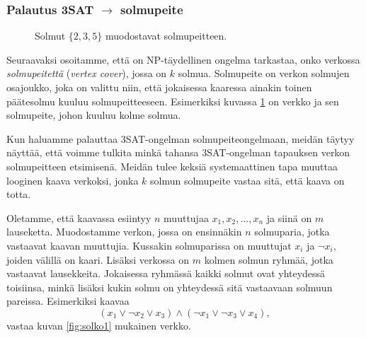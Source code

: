 \subsubsection{Palautus 3SAT $\rightarrow$ solmupeite}


\begin{figure}
\center
\begin{center}
\end{center}
\caption{Solmut $\{2,3,5\}$ muodostavat solmupeitteen.}
\label{fig:solpei}
\end{figure}

Seuraavaksi osoitamme, että on NP-täydellinen ongelma tarkastaa,
onko verkossa \emph{solmupeitettä} (\emph{vertex cover}), jossa on $k$ solmua.
Solmupeite on verkon solmujen osa\-joukko, joka on valittu niin,
että jokaisessa kaaressa ainakin toinen pääte\-solmu kuuluu
solmupeitteeseen.
Esimerkiksi kuvassa \ref{fig:solpei} on verkko ja sen solmupeite,
johon kuuluu kolme solmua.

Kun haluamme palauttaa 3SAT-ongelman solmupeiteongelmaan,
meidän täytyy näyttää, että voimme tulkita minkä tahansa
3SAT-ongelman tapauksen verkon solmupeitteen etsimisenä.
Meidän tulee keksiä systemaattinen tapa
muuttaa looginen kaava verkoksi,
jonka $k$ solmun solmupeite vastaa sitä, että kaava on totta.

Oletamme, että kaavassa esiintyy $n$ muuttujaa $x_1,x_2,\dots,x_n$
ja siinä on $m$ lauseketta.
Muodostamme verkon, jossa on ensinnäkin $n$ solmuparia,
jotka vastaavat kaavan muuttujia.
Kussakin solmuparissa on muuttujat $x_i$ ja $\neg x_i$,
joiden välillä on kaari.
Lisäksi verkossa on $m$ kolmen solmun ryhmää,
jotka vastaavat lausekkeita.
Jokaisessa ryhmässä kaikki solmut ovat yhteydessä toisiinsa,
minkä lisäksi kukin solmu on yhteydessä sitä vastaavaan solmuun pareissa.
Esimerkiksi kaavaa
\[(x_1 \lor \neg x_2 \lor x_3) \land (\neg x_1 \lor \neg x_3 \lor x_4),\]
vastaa kuvan \ref{fig:solko1} mukainen verkko.

